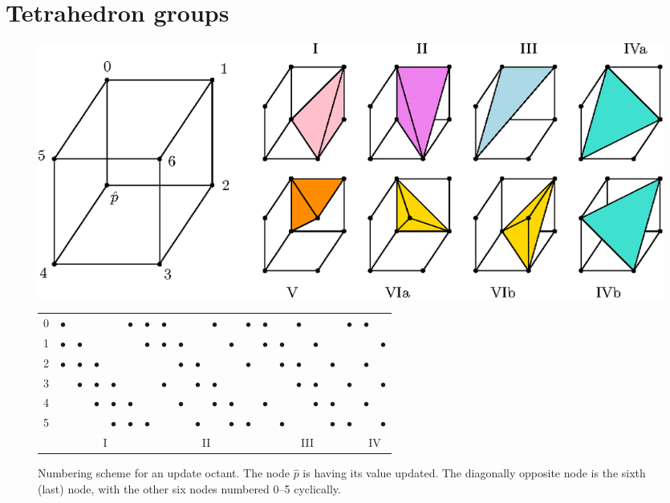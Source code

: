 \documentclass[eikonal.tex]{subfiles}
\begin{document}
\section{Tetrahedron groups}\label{sec:tetra-groups}

\begin{figure}[H]
  \centering
  \includegraphics{simplex-groups.eps}
  \caption{Numbering scheme for an update octant. The node $\hat{p}$
    is having its value updated. The diagonally opposite node is the
    sixth (last) node, with the other six nodes numbered 0--5
    cyclically.}\label{fig:octant-numbering}
  \vspace{1em}
  \begin{tabular}{c|cccccc|cccccc|cccccc|cc}
    0 & $\bullet$ & & & & $\bullet$ & $\bullet$ & $\bullet$ & & & $\bullet$ & & $\bullet$ & $\bullet$ & & $\bullet$ & & & $\bullet$ & $\bullet$ & \\
    1 & $\bullet$ & $\bullet$ & & & & $\bullet$ & $\bullet$ & $\bullet$ & & & $\bullet$ & & $\bullet$ & $\bullet$ & & $\bullet$ & & & & $\bullet$ \\
    2 & $\bullet$ & $\bullet$ & $\bullet$ & & & & & $\bullet$ & $\bullet$ & & & $\bullet$ & & $\bullet$ & $\bullet$ & & $\bullet$ & & $\bullet$ & \\
    3 & & $\bullet$ & $\bullet$ & $\bullet$ & & & $\bullet$ & & $\bullet$ & $\bullet$ & & & & & $\bullet$ & $\bullet$ & & $\bullet$ & & $\bullet$ \\
    4 & & & $\bullet$ & $\bullet$ & $\bullet$ & & & $\bullet$ & & $\bullet$ & $\bullet$ & & $\bullet$ & & & $\bullet$ & $\bullet$ & & $\bullet$ & \\
    5 & & & & $\bullet$ & $\bullet$ & $\bullet$ & & & $\bullet$ & & $\bullet$ & $\bullet$ & & $\bullet$ & & & $\bullet$ & $\bullet$ & & $\bullet$ \\
    \multicolumn{1}{c}{} & \multicolumn{6}{c}{I} & \multicolumn{6}{c}{II} & \multicolumn{6}{c}{III} & \multicolumn{2}{c}{IV}
  \end{tabular}

\end{figure}
\end{document}
